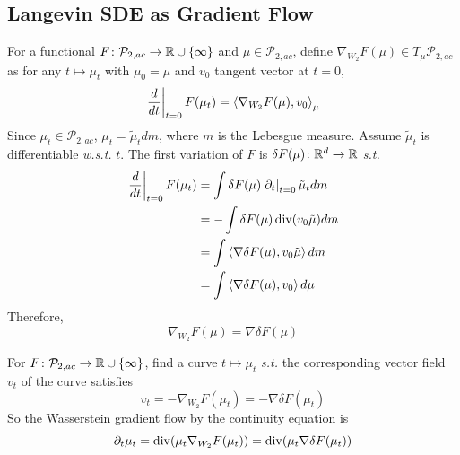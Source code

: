 \documentclass[a4paper,12pt]{article}
\begin{document}
\begin{itemize}
\end{itemize}

\subsection{Langevin SDE as Gradient Flow}

For a functional $F \colon \mathcal{P}_{2,ac} \rightarrow \mathbb{R} \cup \left\{\infty\right\}$ and $\mu \in \mathcal{P}_{2,ac}$, define $\nabla_{W_2}F(\mu) \in T_\mu \mathcal{P}_{2,ac}$ as for any $t \mapsto \mu_t$ with $\mu_0 = \mu$ and $v_0$ tangent vector at $t=0$,
\begin{equation*}
  \left.\frac{d}{dt}\right\lvert_{t=0}F(\mu_t) = \left\langle \nabla_{W_2} F(\mu),v_0 \right\rangle_{\mu}
\end{equation*}
Since $\mu_t \in \mathcal{P}_{2,ac}$, $\mu_t = \tilde{\mu}_tdm$, where $m$ is the Lebesgue measure. Assume $\tilde{\mu}_t$ is differentiable \emph{w.s.t.} $t$. The first variation of $F$ is $\delta F(\mu) \colon \mathbb{R}^d \rightarrow \mathbb{R}$ \emph{s.t.}
\begin{equation*}
  \begin{split}
    \left.\frac{d}{dt}\right\lvert_{t=0}F(\mu_t) &= \int \delta F(\mu) \left.\partial_t\right\lvert_{t=0} \tilde{\mu}_tdm \\
    &= -\int \delta F(\mu) \operatorname{div}(v_0\tilde{\mu})dm \\
    &= \int \left\langle \nabla \delta F(\mu), v_0\tilde{\mu} \right\rangle dm\\
    &= \int \left\langle \nabla \delta F(\mu), v_0 \right\rangle d\mu
  \end{split}
\end{equation*}
Therefore,
\begin{equation*}
  \nabla_{W_2} F(\mu) = \nabla \delta F(\mu)
\end{equation*}

\noindent For $F \colon \mathcal{P}_{2,ac} \rightarrow \mathbb{R} \cup \left\{\infty\right\}$, find a curve $t \mapsto \mu_t$ \emph{s.t.} the corresponding vector field $v_t$ of the curve satisfies
\begin{equation*}
  v_t = -\nabla_{W_2} F(\mu_t) = -\nabla \delta F(\mu_t)
\end{equation*}
So the Wasserstein gradient flow by the continuity equation is
\begin{equation*}
  \partial_t \mu_t = \operatorname{div}(\mu_t\nabla_{W_2} F(\mu_t)) = \operatorname{div}(\mu_t\nabla \delta F(\mu_t))
\end{equation*}
\end{document}

